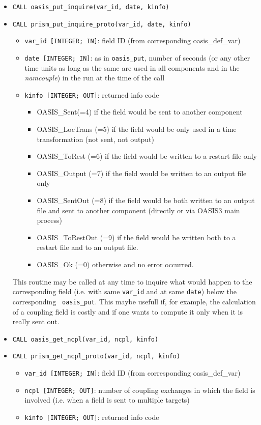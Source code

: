 \begin{itemize}
\item {\tt CALL oasis\_put\_inquire(var\_id, date, kinfo)}
\item {\tt CALL prism\_put\_inquire\_proto(var\_id, date, kinfo)}
  \begin{itemize}
  \item {\tt var\_id [INTEGER; IN]}: field ID (from
  corresponding oasis\_def\_var)
  \item {\tt date [INTEGER; IN]}: as in {\tt oasis\_put}, number of seconds (or any other time
    units as long as the same are used in all components and in the {\it
      namcouple}) in the run at the time of the call
  \item {\tt kinfo [INTEGER; OUT]}: returned info code
    \begin{itemize}
    \item OASIS\_Sent(=4) if the field would be sent to another component
    \item OASIS\_LocTrans (=5) if the field would be only used in a time
      transformation (not sent, not output)
    \item OASIS\_ToRest (=6) if the field would be written to a restart
      file only
    \item OASIS\_Output (=7) if the field would be written to an output
      file only
    \item OASIS\_SentOut (=8) if the field would be both written to an
      output file and sent to another component (directly or via OASIS3
      main process)
    \item OASIS\_ToRestOut (=9) if the field would be written both to a
      restart file and to an output file.
    \item OASIS\_Ok (=0) otherwise and no error occurred.
    \end{itemize}
  \end{itemize}

This routine may be called at any time to
inquire what would happen to the corresponding field (i.e. with same
{\tt var\_id} and at same {\tt date}) below the corresponding {\tt
  oasis\_put}. This maybe usefull if, for example, the calculation of
a coupling field is costly and if one wants to compute it only when it is
really sent out.

\item {\tt CALL oasis\_get\_ncpl(var\_id, ncpl, kinfo)}
\item {\tt CALL prism\_get\_ncpl\_proto(var\_id, ncpl, kinfo)}
  \begin{itemize}
  \item {\tt var\_id [INTEGER; IN]}: field ID (from
  corresponding oasis\_def\_var)
  \item {\tt ncpl [INTEGER; OUT]}: number of coupling exchanges in which the field
  is involved (i.e. when a field is sent to multiple targets) 
  \item {\tt kinfo [INTEGER; OUT]}: returned info code
  \end{itemize}


\end{itemize}
